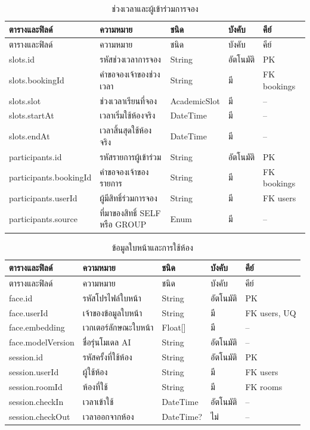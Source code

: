 \documentclass[14pt,a4paper,oneside]{extreport}
\begin{document}
{\begin{longtable}{L{29mm}L{56mm}L{24mm}L{18mm}L{17mm}}
\caption{ช่วงเวลาและผู้เข้าร่วมการจอง}\\\toprule ตารางและฟิลด์ & ความหมาย & ชนิด & บังคับ & คีย์\\\midrule\endfirsthead
\toprule ตารางและฟิลด์ & ความหมาย & ชนิด & บังคับ & คีย์\\\midrule\endhead
slots.id & รหัสช่วงเวลาการจอง & String & อัตโนมัติ & PK\\
slots.bookingId & คำขอจองเจ้าของช่วงเวลา & String & มี & FK bookings\\
slots.slot & ช่วงเวลาเรียนที่จอง & AcademicSlot & มี & --\\
slots.startAt & เวลาเริ่มใช้ห้องจริง & DateTime & มี & --\\
slots.endAt & เวลาสิ้นสุดใช้ห้องจริง & DateTime & มี & --\\
participants.id & รหัสรายการผู้เข้าร่วม & String & อัตโนมัติ & PK\\
participants.bookingId & คำขอจองเจ้าของรายการ & String & มี & FK bookings\\
participants.userId & ผู้มีสิทธิ์ร่วมการจอง & String & มี & FK users\\
participants.source & ที่มาของสิทธิ์ SELF หรือ GROUP & Enum & มี & --\\
\bottomrule\end{longtable}

\begin{longtable}{L{29mm}L{56mm}L{24mm}L{18mm}L{17mm}}
\caption{ข้อมูลใบหน้าและการใช้ห้อง}\\\toprule ตารางและฟิลด์ & ความหมาย & ชนิด & บังคับ & คีย์\\\midrule\endfirsthead
\toprule ตารางและฟิลด์ & ความหมาย & ชนิด & บังคับ & คีย์\\\midrule\endhead
face.id & รหัสโปรไฟล์ใบหน้า & String & อัตโนมัติ & PK\\
face.userId & เจ้าของข้อมูลใบหน้า & String & มี & FK users, UQ\\
face.embedding & เวกเตอร์ลักษณะใบหน้า & Float[] & มี & --\\
face.modelVersion & ชื่อรุ่นโมเดล AI & String & อัตโนมัติ & --\\
session.id & รหัสครั้งที่ใช้ห้อง & String & อัตโนมัติ & PK\\
session.userId & ผู้ใช้ห้อง & String & มี & FK users\\
session.roomId & ห้องที่ใช้ & String & มี & FK rooms\\
session.checkIn & เวลาเข้าใช้ & DateTime & อัตโนมัติ & --\\
session.checkOut & เวลาออกจากห้อง & DateTime? & ไม่ & --\\
\bottomrule\end{longtable}

}
\end{document}
